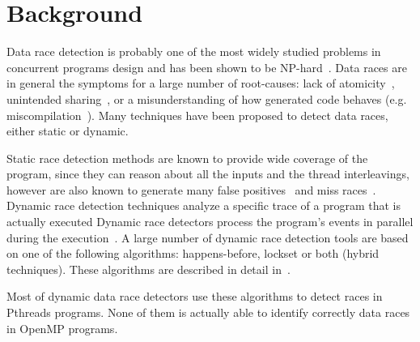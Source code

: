 \section{Background}
\label{sec:background}

Data race detection is probably one of the most widely studied problems in
concurrent programs design and has been shown to be
NP-hard~\cite{netzer-miller}.
%
Data races are in general the symptoms for a large number of root-causes: lack
of atomicity~\cite{usenix-race-erickson-et-al}, unintended
sharing~\cite{race-rv-2012-talk}, or a misunderstanding of how generated code
behaves (e.g. miscompilation~\cite{Boehm:2011:MPB:2001252.2001255}).
%
Many techniques have been proposed to detect data races, either static or
dynamic.

Static race detection methods are known to provide wide coverage of the
program, since they can reason about all the inputs and the thread
interleavings, however are also known to generate many false
positives~\cite{Pratikakis:2011:LPS:1889997.1890000} and miss
races~\cite{Voung:2007:RSR:1287624.1287654}.
%
Dynamic race detection techniques analyze a specific trace of a program
that is actually executed
%
Dynamic race detectors process the program’s events in parallel during the
execution~\cite{Lamport:1978:TCO:359545.359563, Savage:1997:EDD:269005.266641,
  Flanagan:2009, tsan}.
%
A large number of dynamic race detection tools are based on one of the
following algorithms: happens-before, lockset or both (hybrid techniques).
%
These algorithms are described in detail
in~\cite{O'Callahan:2003:HDD:966049.781528}.

Most of dynamic data race detectors use these algorithms to detect races in
Pthreads programs.
%
None of them is actually able to identify correctly data races in OpenMP
programs.
%


